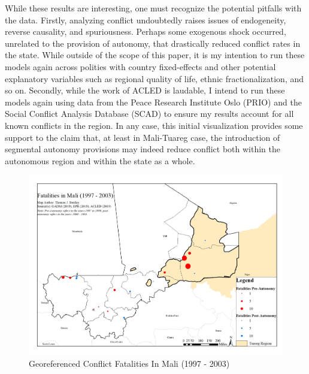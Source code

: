 \documentclass[12pt]{elsarticle}
\begin{document}
While these results are interesting, one must recognize the potential pitfalls with the data. Firstly, analyzing conflict undoubtedly raises issues of endogeneity, reverse causality, and spuriousness. Perhaps some exogenous shock occurred, unrelated to the provision of autonomy, that drastically reduced conflict rates in the state. While outside of the scope of this paper, it is my intention to run these models again across polities with country fixed-effects and other potential explanatory variables such as regional quality of life, ethnic fractionalization, and so on. Secondly, while the work of ACLED is laudable, I intend to run these models again using data from the Peace Research Institute Oslo (PRIO) and the Social Conflict Analysis Database (SCAD) to ensure my results account for all known conflicts in the region. In any case, this initial visualization provides some support to the claim that, at least in Mali-Tuareg case, the introduction of segmental autonomy provisions may indeed reduce conflict both within the autonomous region and within the state as a whole. 

\begin{figure}[h]
\centering\includegraphics[width=\textwidth,height=\textheight,keepaspectratio]{tjbrailey_final_project_map_conf.jpg}
\caption{Georeferenced Conflict Fatalities In Mali (1997 - 2003)}
\end{figure}
\end{document}

